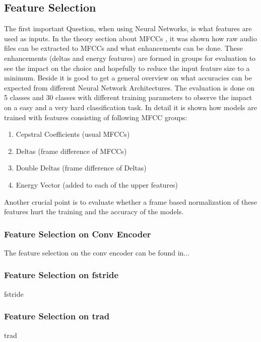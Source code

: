 
\subsection{Feature Selection}
The first important Question, when using Neural Networks, is what features are used as inputs.
In the theory section about MFCCs , it was shown how raw audio files can be extracted to MFCCs and what enhancements can be done.
These enhancements (deltas and energy features) are formed in groups for evaluation to see the impact on the choice and hopefully to reduce the input feature size to a minimum.
Beside it is good to get a general overview on what accuracies can be expected from different Neural Network Architectures.
The evaluation is done on 5 classes and 30 classes with different training parameters to observe the impact on a easy and a very hard classification task.
In detail it is shown how models are trained with features consisting of following MFCC groups:
\begin{enumerate}
    \item Cepstral Coefficients (usual MFCCs)
    \item Deltas (frame difference of MFCCs)
    \item Double Deltas (frame difference of Deltas)
    \item Energy Vector (added to each of the upper features)
\end{enumerate}
Another crucial point is to evaluate whether a frame based normalization of these features hurt the training and the accuracy of the models.

\subsubsection{Feature Selection on Conv Encoder}
The feature selection on the conv encoder can be found in...
% 
% 
% 




\subsubsection{Feature Selection on fstride}
fstride


\subsubsection{Feature Selection on trad}
trad
